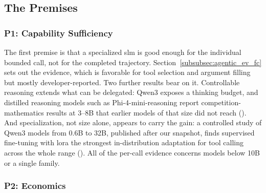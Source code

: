 \subsection{The Premises}
\label{subsec:agentic_case}

\subsubsection{P1: Capability Sufficiency}
\label{subsubsec:agentic_capability}

The first premise is that a specialized \gls{slm} is good enough for the individual bounded call, not for the completed trajectory. Section~\ref{subsubsec:agentic_ev_fc} sets out the evidence, which is favorable for tool selection and argument filling but mostly developer-reported. Two further results bear on it. Controllable reasoning extends what can be delegated: Qwen3 \citep{qwen3_2025} exposes a thinking budget, and distilled reasoning models such as Phi-4-mini-reasoning \citep{xu2025phi4mini_reasoning} report competition-mathematics results at 3--8B that earlier models of that size did not reach (\evC). And specialization, not size alone, appears to carry the gain: a controlled study of Qwen3 models from 0.6B to 32B, published after our snapshot, finds supervised fine-tuning with \gls{lora} the strongest in-distribution adaptation for tool calling across the whole range \citep{laskar2026sftrl} (\evB). All of the per-call evidence concerns models below 10B or a single family.

\subsubsection{P2: Economics}
\label{subsubsec:agentic_economics}

